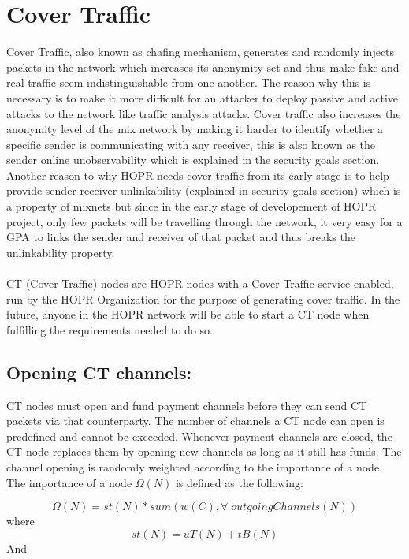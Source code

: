 \section{Cover Traffic}


Cover Traffic, also known as chafing mechanism, generates and randomly injects packets in the network which increases its anonymity set and thus make fake and real traffic seem indistinguishable from one another. The reason why this is necessary is to make it more difficult for an attacker to deploy passive and active attacks to the network like traffic analysis attacks.
Cover traffic also increases the anonymity level of the mix network by making it harder to identify whether a specific sender is communicating with any receiver, this is also known as the sender online unobservability which is explained in the security goals section.
Another reason to why HOPR needs cover traffic from its early stage is to help provide sender-receiver unlinkability (explained in security goals section) which is a property of mixnets but since in the early stage of developement of HOPR project, only few packets will be travelling through the network, it very easy for a GPA to links the sender and receiver of that packet and thus breaks the unlinkability property.
\\~\\ CT (Cover Traffic) nodes are HOPR nodes with a Cover Traffic service enabled, run by the HOPR Organization for the purpose of generating cover traffic. In the future, anyone in the HOPR network will be able to start a CT node when fulfilling the requirements needed to do so.
\subsection{Opening CT channels:} 
CT nodes must open and fund payment channels before they can send CT packets via that counterparty. The number of channels a CT node can open is predefined and cannot be exceeded. Whenever payment channels are closed, the CT node replaces them by opening new channels as long as it still has funds. 
The channel opening is randomly weighted according to the importance of a node. The importance of a node $\Omega(N)$ is defined as the following:

$$\Omega(N) = st(N) * sum(w(C), \forall \; outgoingChannels(N))$$
where 
$$st(N) = uT(N) + tB(N)$$
And 

